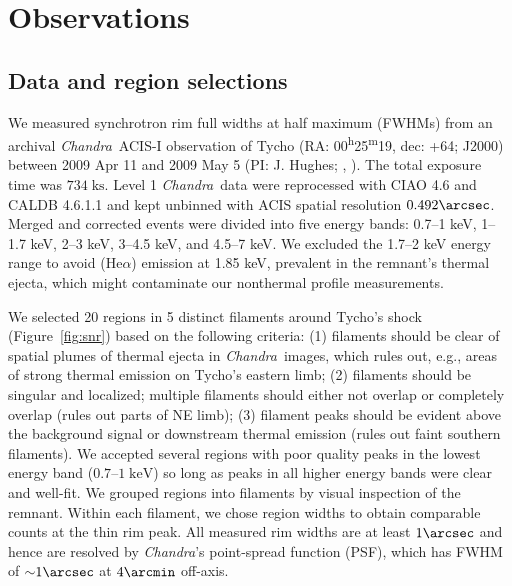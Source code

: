\documentclass[manuscript]{aastex}  %
\newcommand*{\mt}{\mathrm}
\newcommand*{\unit}[1]{\;\mt{#1}}  %
\newcommand*{\abt}{\mathord{\sim}} %
\newcommand*{\tsup}{\textsuperscript}
\newcommand*{\Chandra}{\textit{Chandra}\ }
\begin{document}
\section{Observations}
\label{sec:observations}

\subsection{Data and region selections}
\label{sec:regions}

We measured synchrotron rim full widths at half maximum (FWHMs) from an
archival \Chandra ACIS-I observation of Tycho
(RA: 00\tsup{h}25\tsup{m}19, dec: +64; J2000)
between 2009 Apr 11 and 2009 May 5 (PI: J. Hughes;
,
).
The total exposure time was $734 \unit{ks}$.
Level 1 \Chandra data were reprocessed with CIAO 4.6 and CALDB 4.6.1.1 and kept
unbinned with ACIS spatial resolution $0.492\arcsec$.
Merged and corrected events were divided into five energy bands:
0.7--1 keV, 1--1.7 keV, 2--3 keV, 3--4.5 keV, and 4.5--7 keV.
We excluded the 1.7--2 keV energy range to avoid  (He$\alpha$)
emission at 1.85 keV, prevalent in the remnant's thermal ejecta, which
might contaminate our nonthermal profile measurements.

We selected 20 regions in 5 distinct filaments around Tycho's shock
(Figure~\ref{fig:snr}) based on the following criteria: (1) filaments should be
clear of spatial plumes of thermal ejecta in \Chandra images, which rules out,
e.g., areas of strong thermal emission on Tycho's eastern limb; (2) filaments
should be singular and localized; multiple filaments should either not
overlap or completely overlap (rules out parts of NE limb); (3) filament
peaks should be evident above the background signal or downstream thermal
emission (rules out faint southern filaments).  We accepted several
regions with poor quality peaks in the lowest energy band ($0.7$--$1
\unit{keV}$) so long as peaks in all higher energy bands were clear and
well-fit.  We grouped regions into filaments by visual inspection of the
remnant.  Within each filament, we chose region widths to obtain comparable
counts at the thin rim peak.  All measured rim widths are at least $1\arcsec$
and hence are resolved by \textit{Chandra}'s point-spread function (PSF), which
has FWHM of $\abt 1\arcsec$ at $4\arcmin$ off-axis.
\end{document}
